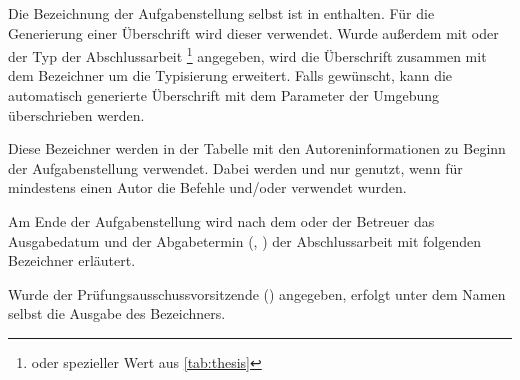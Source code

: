 \begin{Bundle*}{}
\begin{Declaration}{}
\begin{Declaration}{}
\printdeclarationlist%
%
Die Bezeichnung der Aufgabenstellung selbst ist in  enthalten. 
Für die Generierung einer Überschrift wird dieser verwendet. Wurde außerdem mit 
 oder  der Typ der Abschlussarbeit%
\footnote{%
   oder spezieller Wert aus \autoref{tab:thesis}
}
angegeben, wird die Überschrift zusammen mit dem Bezeichner 
um die Typisierung erweitert. Falls gewünscht, kann die automatisch generierte 
Überschrift mit dem Parameter  der Umgebung 
 überschrieben werden.
\end{Declaration}
\end{Declaration}

\begin{Declaration}[v2.04]{}
\begin{Declaration}{}
\begin{Declaration}{}
\begin{Declaration}[v2.02]{}
\printdeclarationlist%
%
Diese Bezeichner werden in der Tabelle mit den Autoreninformationen zu Beginn 
der Aufgabenstellung verwendet. Dabei werden  und 
 nur genutzt, wenn für mindestens einen Autor die Befehle 
 und/oder  verwendet wurden.
\end{Declaration}
\end{Declaration}
\end{Declaration}
\end{Declaration}

\begin{Declaration}{}
\begin{Declaration}{}
\printdeclarationlist%
%
Am Ende der Aufgabenstellung wird nach dem oder der Betreuer das Ausgabedatum 
und der Abgabetermin (, ) der Abschlussarbeit 
mit folgenden Bezeichner erläutert.
\end{Declaration}
\end{Declaration}

\begin{Declaration}{}
\printdeclarationlist%
%
Wurde der Prüfungsausschussvorsitzende () angegeben, erfolgt 
unter dem Namen selbst die Ausgabe des Bezeichners.
\end{Declaration}


\end{Bundle*}
